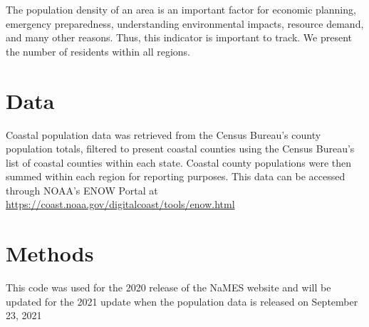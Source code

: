 \documentclass[
]{book}
\begin{document}
The population density of an area is an important factor for economic planning, emergency preparedness, understanding environmental impacts, resource demand, and many other reasons. Thus, this indicator is important to track. We present the number of residents within all regions.

\hypertarget{data-10}{%
\section{Data}\label{data-10}}

Coastal population data was retrieved from the Census Bureau's county population totals, filtered to present coastal counties using the Census Bureau's list of coastal counties within each state. Coastal county populations were then summed within each region for reporting purposes. This data can be accessed through NOAA's ENOW Portal at \url{https://coast.noaa.gov/digitalcoast/tools/enow.html}

\hypertarget{methods-10}{%
\section{Methods}\label{methods-10}}

This code was used for the 2020 release of the NaMES website and will be updated for the 2021 update when the population data is released on September 23, 2021
\end{document}
